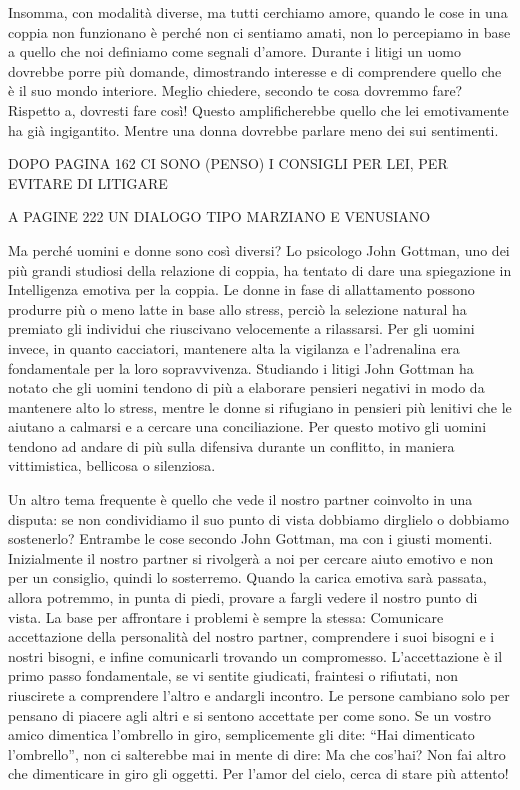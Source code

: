 \documentclass[12pt]{book} %
\begin{document}
Insomma, con modalità diverse, ma tutti cerchiamo amore, quando le cose in una coppia non funzionano è perché non ci
sentiamo amati, non lo percepiamo in base a quello che noi definiamo come segnali d'amore. Durante
i litigi un uomo dovrebbe porre più domande, dimostrando interesse e di comprendere quello che è il suo mondo
interiore. Meglio chiedere, secondo te cosa dovremmo fare? Rispetto a, dovresti fare così! Questo amplificherebbe
quello che lei emotivamente ha già ingigantito. Mentre una donna dovrebbe parlare meno dei sui sentimenti.

DOPO PAGINA 162 CI SONO (PENSO) I CONSIGLI PER LEI, PER EVITARE DI LITIGARE

A PAGINE 222 UN DIALOGO TIPO MARZIANO E VENUSIANO

Ma perché uomini e donne sono così diversi? Lo psicologo John Gottman, uno dei più grandi studiosi della relazione di
coppia, ha tentato di dare una spiegazione in Intelligenza emotiva per la
coppia. Le donne in fase di allattamento possono produrre più o meno
latte in base allo stress, perciò la selezione natural ha premiato gli individui che riuscivano velocemente a
rilassarsi. Per gli uomini invece, in quanto cacciatori, mantenere alta la vigilanza e
l'adrenalina era fondamentale per la loro sopravvivenza. Studiando i litigi John Gottman ha notato
che gli uomini tendono di più a elaborare pensieri negativi in modo da mantenere alto lo stress, mentre le donne si
rifugiano in pensieri più lenitivi che le aiutano a calmarsi e a cercare una conciliazione.\newline
Per questo motivo gli uomini tendono ad andare di più sulla difensiva durante un conflitto, in maniera vittimistica,
bellicosa o silenziosa.

Un altro tema frequente è quello che vede il nostro partner coinvolto in una disputa: se non condividiamo il suo punto
di vista dobbiamo dirglielo o dobbiamo sostenerlo? Entrambe le cose secondo John Gottman, ma con i giusti momenti.
Inizialmente il nostro partner si rivolgerà a noi per cercare aiuto emotivo e non per un consiglio, quindi lo
sosterremo. Quando la carica emotiva sarà passata, allora potremmo, in punta di piedi, provare a fargli vedere il
nostro punto di vista. La base per affrontare i problemi è sempre la stessa: Comunicare accettazione della personalità
del nostro partner, comprendere i suoi bisogni e i nostri bisogni, e infine comunicarli trovando un compromesso.
L'accettazione è il primo passo fondamentale, se vi sentite giudicati, fraintesi o rifiutati, non
riuscirete a comprendere l'altro e andargli incontro. Le persone cambiano solo per pensano di
piacere agli altri e si sentono accettate per come sono. Se un vostro amico dimentica l'ombrello
in giro, semplicemente gli dite: “Hai dimenticato l'ombrello”, non ci salterebbe mai in mente di
dire: Ma che cos'hai? Non fai altro che dimenticare in giro gli oggetti. Per
l'amor del cielo, cerca di stare più attento! 
\end{document}
